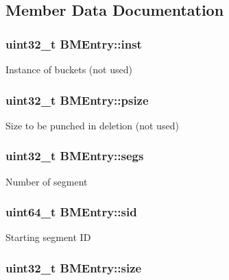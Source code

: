 \subsection{\-Member \-Data \-Documentation}
\hypertarget{structBMEntry_a49af9e59a07d208b45d4e40815b93488}{
\subsubsection[{inst}]{\setlength{\rightskip}{0pt plus 5cm}uint32\-\_\-t {\bf \-B\-M\-Entry\-::inst}}}\label{structBMEntry_a49af9e59a07d208b45d4e40815b93488}
\-Instance of buckets (not used) \hypertarget{structBMEntry_ae3868e1dcdcb708366dc4a23b2f707ef}{
\subsubsection[{psize}]{\setlength{\rightskip}{0pt plus 5cm}uint32\-\_\-t {\bf \-B\-M\-Entry\-::psize}}}\label{structBMEntry_ae3868e1dcdcb708366dc4a23b2f707ef}
\-Size to be punched in deletion (not used) \hypertarget{structBMEntry_a223ee21a6a789e0ff7fbab0625f7958f}{
\subsubsection[{segs}]{\setlength{\rightskip}{0pt plus 5cm}uint32\-\_\-t {\bf \-B\-M\-Entry\-::segs}}}\label{structBMEntry_a223ee21a6a789e0ff7fbab0625f7958f}
\-Number of segment \hypertarget{structBMEntry_a86084e47eeb55740eb5782b4e2c01010}{
\subsubsection[{sid}]{\setlength{\rightskip}{0pt plus 5cm}uint64\-\_\-t {\bf \-B\-M\-Entry\-::sid}}}\label{structBMEntry_a86084e47eeb55740eb5782b4e2c01010}
\-Starting segment \-I\-D \hypertarget{structBMEntry_adf6e7d636ace7973d4219f9cb2230cb5}{
\subsubsection[{size}]{\setlength{\rightskip}{0pt plus 5cm}uint32\-\_\-t {\bf \-B\-M\-Entry\-::size}}}\label{structBMEntry_adf6e7d636ace7973d4219f9cb2230cb5}
